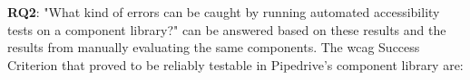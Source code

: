 \documentclass{master_thesis}
\begin{document}
\textbf{RQ2}: "What kind of errors can be caught by running automated accessibility tests on a component library?" can be answered based on these results and the results from manually evaluating the same components. The \ac{wcag} Success Criterion that proved to be reliably testable in Pipedrive's component library are:
\end{document}

